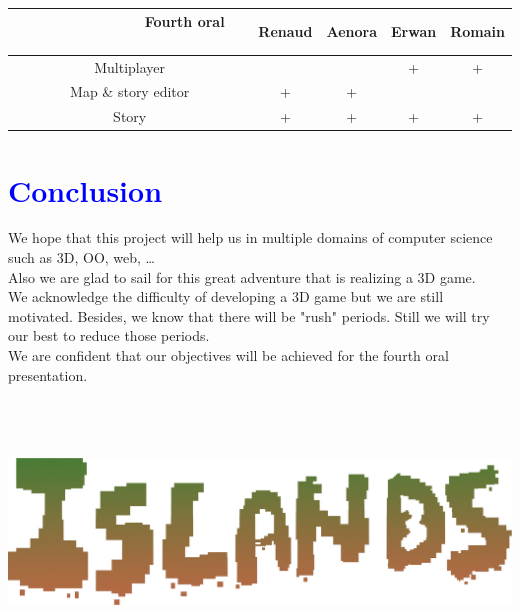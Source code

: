\documentclass[article]{report} %
\begin{document}
\begin{center}
						~~~\begin{tabular}{|c|c|c|c|c|}
							\hline
								~~~~~~~~~~~~~ \textbf{Fourth oral} ~~~~~~~~~~~~  & \textbf{Renaud} & \textbf{Aenora} & \textbf{Erwan} & \textbf{Romain} \\
							\hline
 								Multiplayer &  &  & + & + \\
							\hline
								 Map \& story editor & + & + &  &  \\
							\hline
								 Story & + & + & + & + \\
							\hline
						\end{tabular}
\end{center}



				\chapter{\textcolor{blue}{Conclusion}}
					We hope that this project will help us in multiple domains of computer science such as 3D, \ac{OO}, web, \dots \\
					Also we are glad to sail for this great adventure that is realizing a 3D game. \\

					We acknowledge the difficulty of developing a 3D game but we are still motivated. Besides, we know that there will be "rush" periods. Still we will try our best to reduce those periods.\\
					We are confident that our objectives will be achieved for the fourth oral presentation.
\\ ~\\ ~\\ ~

					 

					


				\begin{center}
					\includegraphics[width = 16cm]{Images/Islands_Title.png}
				\end{center}     	     		
\end{document}
